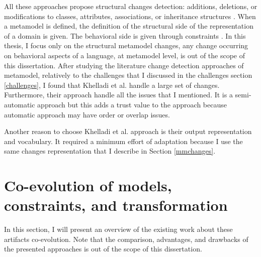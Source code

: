 All these approaches propose structural changes detection: additions, deletions, or modifications to classes, attributes, associations, or inheritance structures \cite{10.1007/s10270-013-0392-y}. When a metamodel is defined, the definition of the structural side of the representation of a domain is given. The behavioral side is given through constraints \cite{10.1007/s10515-009-0053-0}. In this thesis, I focus only on the structural metamodel changes, any change occurring on behavioral aspects of a language, at metamodel level, is out of the scope of this dissertation.
After studying the literature change detection approaches of metamodel, relatively to the challenges that I discussed in the challenges section \ref{challenges}, I found that Khelladi et al. \cite{khelladi2016detecting} handle a large set of changes. Furthermore, their approach handle all the issues that I mentioned. 
It is a semi-automatic approach but this adds a trust value to the approach because automatic approach may have order or overlap issues.

Another reason to choose Khelladi et al. \cite{khelladi2016detecting} approach is their output representation and vocabulary. It required a minimum effort of adaptation because I use the same changes representation that I describe in Section \ref{mmchanges}.


 \section{Co-evolution of models, constraints, and transformation}
 \label{coevolutionartifacts}
 In this section, I will present an overview of the existing work about these artifacts co-evolution. Note that the comparison, advantages, and drawbacks of the presented approaches is out of the scope of this dissertation.
 
